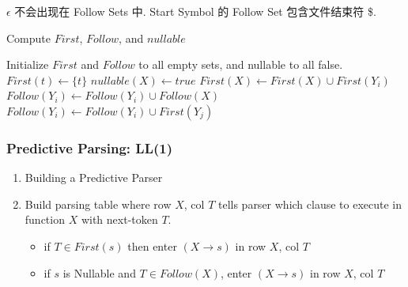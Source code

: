 $\epsilon$ 不会出现在 Follow Sets 中. Start Symbol 的 Follow Set 包含文件结束符 \$. 

\begin{algorithm}[H]
    \caption{Compute $First$, $Follow$, and $nullable$}
    \begin{algorithmic}
        \State Initialize $First$ and $Follow$ to all empty sets, and nullable to all false.
            \State $First(t)\gets \{ t \}$
        \EndFor
        \Repeat
                        \State $nullable(X)\gets true$
                    \EndIf
                        \State $First(X)\gets First(X)\cup First(Y_i)$
                    \EndIf
                        \State $Follow(Y_i)\gets Follow(Y_i)\cup Follow(X)$
                    \EndIf
                        \State $Follow(Y_i)\gets Follow(Y_i)\cup First(Y_j)$
                    \EndIf
                \EndFor
            \EndFor
    \end{algorithmic}
\end{algorithm}

\subsubsection{Predictive Parsing: LL(1)}

\begin{enumerate}
    \item Building a Predictive Parser
    \item Build parsing table where row $X$, col $T$ tells parser which clause to execute in function $X$ with next-token $T$.
    \begin{itemize}
        \item if $T\in First(s)$ then enter $(X\to s)$ in row $X$, col $T$
        \item if $s$ is Nullable and $T\in Follow(X)$, enter $(X\to s)$ in row $X$, col $T$
    \end{itemize}
    
\end{enumerate}


